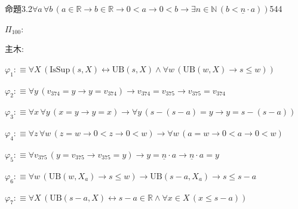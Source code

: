 \begin{fullproof}{命題3.2}{$\forall a\,\forall b\,(a \in \mathbb{R} \to b \in \mathbb{R} \to 0 < a \to 0 < b \to \exists n \in \mathbb{N}\,(b < \underline{n} \cdot a))$}{544}
\begin{ptree}
\noLine
{}
\end{ptree}
\noindent$\Pi_{100}$:
\begin{ptree}
\noLine
{}
\end{ptree}
\noindent 主木:
\begin{ptree}
\noLine
{}
\noLine
{}
\end{ptree}
\begin{abbrevlist}
\item $\varphi_{1} :\equiv \forall X\,(\mathrm{IsSup}(s,X) \leftrightarrow \mathrm{UB}(s,X) \land \forall w\,(\mathrm{UB}(w,X) \to s \leq w))$
\item $\varphi_{2} :\equiv \forall y\,(v_{374} = y \to y = v_{374}) \to v_{374} = v_{375} \to v_{375} = v_{374}$
\item $\varphi_{3} :\equiv \forall x\,\forall y\,(x = y \to y = x) \to \forall y\,(s - (s - a) = y \to y = s - (s - a))$
\item $\varphi_{4} :\equiv \forall z\,\forall w\,(z = w \to 0 < z \to 0 < w) \to \forall w\,(a = w \to 0 < a \to 0 < w)$
\item $\varphi_{5} :\equiv \forall v_{375}\,(y = v_{375} \to v_{375} = y) \to y = \underline{n} \cdot a \to \underline{n} \cdot a = y$
\item $\varphi_{6} :\equiv \forall w\,(\mathrm{UB}(w,X_{a}) \to s \leq w) \to \mathrm{UB}(s - a,X_{a}) \to s \leq s - a$
\item $\varphi_{7} :\equiv \forall X\,(\mathrm{UB}(s - a,X) \leftrightarrow s - a \in \mathbb{R} \land \forall x \in X\,(x \leq s - a))$

\end{abbrevlist}
\end{fullproof}

